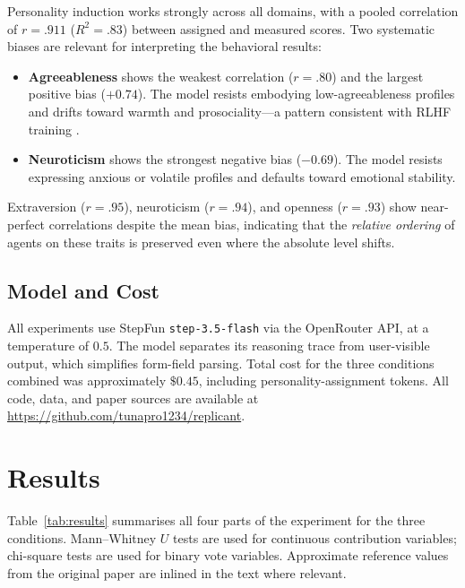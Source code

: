 \documentclass[12pt, a4paper]{article}
\begin{document}
Personality induction works strongly across all domains, with a pooled correlation of $r = .911$ ($R^2 = .83$) between assigned and measured scores. Two systematic biases are relevant for interpreting the behavioral results:
\begin{itemize}
  \item \textbf{Agreeableness} shows the weakest correlation ($r = .80$) and the largest positive bias ($+0.74$). The model resists embodying low-agreeableness profiles and drifts toward warmth and prosociality---a pattern consistent with RLHF training \citep{salecha2024social}.
  \item \textbf{Neuroticism} shows the strongest negative bias ($-0.69$). The model resists expressing anxious or volatile profiles and defaults toward emotional stability.
\end{itemize}
Extraversion ($r = .95$), neuroticism ($r = .94$), and openness ($r = .93$) show near-perfect correlations despite the mean bias, indicating that the \emph{relative ordering} of agents on these traits is preserved even where the absolute level shifts.

\subsection{Model and Cost}

All experiments use StepFun \texttt{step-3.5-flash} via the OpenRouter API, at a temperature of $0.5$. The model separates its reasoning trace from user-visible output, which simplifies form-field parsing. Total cost for the three conditions combined was approximately $\$0.45$, including personality-assignment tokens. All code, data, and paper sources are available at \url{https://github.com/tunapro1234/replicant}.

\section{Results}

Table~\ref{tab:results} summarises all four parts of the experiment for the three conditions. Mann--Whitney $U$ tests are used for continuous contribution variables; chi-square tests are used for binary vote variables. Approximate reference values from the original paper are inlined in the text where relevant.
\end{document}
